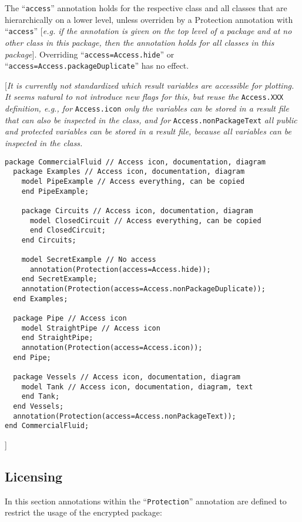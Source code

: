 The ``\lstinline!access!'' annotation holds for the respective class and all classes
that are hierarchically on a lower level, unless overriden by a
Protection annotation with ``\lstinline!access!'' {[}\emph{e.g. if the annotation is
given on the top level of a package and at no other class in this
package, then the annotation holds for all classes in this package}{]}.
Overriding ``\lstinline!access=Access.hide!'' or ``\lstinline!access=Access.packageDuplicate!''
has no effect.

{[}\emph{It is currently not standardized which result variables are
accessible for plotting. It seems natural to not introduce new flags for
this, but reuse the} \lstinline!Access.XXX! \emph{definition, e.g., for} \lstinline!Access.icon!
\emph{only the variables can be stored in a result file that can also be
inspected in the class, and for} \lstinline!Access.nonPackageText! \emph{all public
and protected variables can be stored in a result file, because all
variables can be inspected in the class.}

\begin{lstlisting}[language=modelica]
package CommercialFluid // Access icon, documentation, diagram
  package Examples // Access icon, documentation, diagram
    model PipeExample // Access everything, can be copied
    end PipeExample;

    package Circuits // Access icon, documentation, diagram
      model ClosedCircuit // Access everything, can be copied
      end ClosedCircuit;
    end Circuits;

    model SecretExample // No access
      annotation(Protection(access=Access.hide));
    end SecretExample;
    annotation(Protection(access=Access.nonPackageDuplicate));
  end Examples;

  package Pipe // Access icon
    model StraightPipe // Access icon
    end StraightPipe;
    annotation(Protection(access=Access.icon));
  end Pipe;

  package Vessels // Access icon, documentation, diagram
    model Tank // Access icon, documentation, diagram, text
    end Tank;
  end Vessels;
  annotation(Protection(access=Access.nonPackageText));
end CommercialFluid;
\end{lstlisting}
{]}

\subsection{Licensing}

In this section annotations within the ``\lstinline!Protection!'' annotation are
defined to restrict the usage of the encrypted package:

